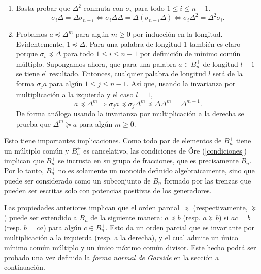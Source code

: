 \documentclass[TFG.tex]{subfiles}
\begin{document}
\begin{dem}
\begin{enumerate}
\item Basta probar que $\Delta^2$ conmuta con $\sigma_i$ para todo $1\leq i\leq n-1$. 
\[
\sigma_i\Delta=\Delta\sigma_{n-i}\Leftrightarrow \sigma_i\Delta\Delta=\Delta(\sigma_{n-i}\Delta)\Leftrightarrow \sigma_i\Delta^2=\Delta^2\sigma_i.
\]

\item Probamos $a\preccurlyeq\Delta^m$ para algún $m\geq 0$ por inducción en la longitud. Evidentemente, $1\preccurlyeq\Delta$. Para una palabra de longitud 1 también es claro porque $\sigma_i\preccurlyeq\Delta$ para todo $1\leq i\leq n-1$ por definición de mínimo común múltiplo. Supongamos ahora, que para una palabra $a\in B_n^+$ de longitud $l-1$ se tiene el resultado. Entonces, cualquier palabra de longitud $l$ será de la forma $\sigma_j a$ para algún $1\leq j\leq n-1$. Así que, usando la invarianza por multiplicación a la izquierda y el caso $l=1$,
\[
a\preccurlyeq\Delta^m\Rightarrow \sigma_j a\preccurlyeq \sigma_j\Delta^m \preccurlyeq \Delta\Delta^m=\Delta^{m+1}.
\]
De forma análoga usando la invarianza por multiplicación a la derecha se prueba que $\Delta^m\succcurlyeq a$ para algún $m\geq 0$.
\end{enumerate}
\QED
\end{dem}



Esto tiene importantes implicaciones. Como todo par de elementos de $B_n^+$ tiene un múltiplo común y $B_n^+$ es cancelativo, las condiciones de Öre (\ref{condiciones}) implican que $B_n^+$ se incrusta en su grupo de fracciones, que es precisamente $B_n$. Por lo tanto, $B_n^+$ no es solamente un monoide definido algebraicamente, sino que puede ser considerado como un subconjunto de $B_n$ formado por las trenzas que pueden ser escritas solo con potencias positivas de los generadores. 

Las propiedades anteriores implican que el orden parcial $\preccurlyeq$ (respectivamente, $\succcurlyeq$) puede ser extendido a $B_n$ de la siguiente manera: $a\preccurlyeq b$ (resp. $a\succcurlyeq b$) si $ac=b$ (resp. $b=ca$) para algún $c\in B_n^+$. Esto da un orden parcial que es invariante por multiplicación a la izquierda (resp. a la derecha), y el cual admite un único mínimo común múltiplo y un único máximo común divisor. Este hecho podrá ser probado una vez definida la \emph{forma normal de Garside} en la sección a continuación.
\end{document}
